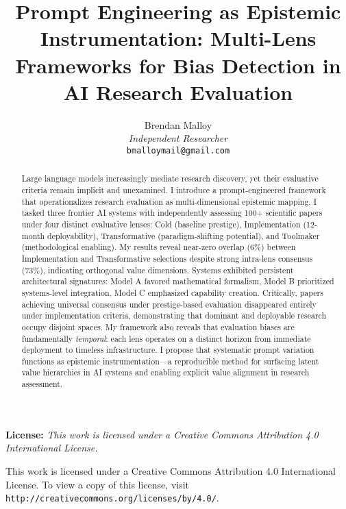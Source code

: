 \documentclass{article}
\begin{document}
\title{Prompt Engineering as Epistemic Instrumentation: Multi-Lens Frameworks for Bias Detection in AI Research Evaluation}

\author{Brendan Malloy\\
\textit{Independent Researcher}\\
\texttt{bmalloymail@gmail.com}}

\maketitle

\begin{abstract}
Large language models increasingly mediate research discovery, yet their evaluative criteria remain implicit and unexamined. I introduce a prompt-engineered framework that operationalizes research evaluation as multi-dimensional epistemic mapping. I tasked three frontier AI systems with independently assessing 100+ scientific papers under four distinct evaluative lenses: Cold (baseline prestige), Implementation (12-month deployability), Transformative (paradigm-shifting potential), and Toolmaker (methodological enabling). My results reveal near-zero overlap (6\%) between Implementation and Transformative selections despite strong intra-lens consensus (73\%), indicating orthogonal value dimensions. Systems exhibited persistent architectural signatures: Model A favored mathematical formalism, Model B prioritized systems-level integration, Model C emphasized capability creation. Critically, papers achieving universal consensus under prestige-based evaluation disappeared entirely under implementation criteria, demonstrating that dominant and deployable research occupy disjoint spaces. My framework also reveals that evaluation biases are fundamentally \textit{temporal}: each lens operates on a distinct horizon from immediate deployment to timeless infrastructure. I propose that systematic prompt variation functions as epistemic instrumentation—a reproducible method for surfacing latent value hierarchies in AI systems and enabling explicit value alignment in research assessment.
\end{abstract}

\textbf{License:} \textit{This work is licensed under a Creative Commons Attribution 4.0 International License.}

\begin{center}
\small
This work is licensed under a Creative Commons Attribution 4.0 International License. 
To view a copy of this license, visit \texttt{http://creativecommons.org/licenses/by/4.0/}.
\end{center}
\end{document}
